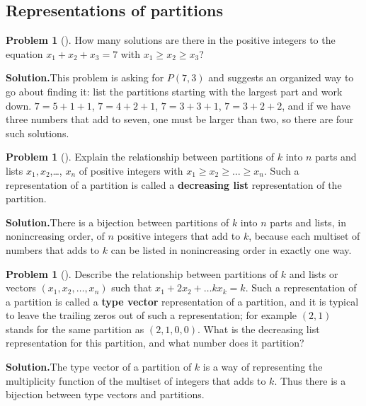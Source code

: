 \documentclass[10pt,]{book}
\newcommand{\terminology}[1]{\textbf{#1}}
\theoremstyle{plain}
\theoremstyle{definition}
\newtheorem{activity}[project]{Problem}
\theoremstyle{definition}
\numberwithin{equation}{chapter}
\begin{document}
\subsection[{Representations of partitions}]{Representations of partitions}\label{subsection-31}
\begin{activity}[]\label{activity-159}
How many solutions are there in the positive integers to the equation \(x_1+x_2+x_3 =7\) with \(x_1\ge x_2\ge x_3\)?%
\par\medskip\noindent%
\textbf{Solution.}\quad This problem is asking for \(P(7,3)\) and suggests an organized way to go about finding it: list the partitions starting with the largest part and work down. \(7=5+1+1\), \(7=4+2+1\), \(7=3+3+1\), \(7=3+2+2\), and if we have three numbers that add to seven, one must be larger than two, so there are four such solutions.%
\end{activity}
\begin{activity}[]\label{activity-160}
Explain the relationship between partitions of \(k\) into \(n\) parts and lists \(x_1,x_2\),\dots{}, \(x_n\) of positive integers with \(x_1\ge x_2\ge\ldots \ge x_n\). Such a representation of a partition is called a \terminology{decreasing list} representation of the partition.%
\par\medskip\noindent%
\textbf{Solution.}\quad There is a bijection between partitions of \(k\) into \(n\) parts and lists, in nonincreasing order, of \(n\) positive integers that add to \(k\), because each multiset of numbers that adds to \(k\) can be listed in nonincreasing order in exactly one way.%
\end{activity}
\begin{activity}[]\label{activity-161}
Describe the relationship between partitions of \(k\) and lists or vectors \((x_1,x_2,\ldots,x_n)\) such that \(x_1+2x_2+\ldots kx_k = k\).  Such a representation of a partition is called a \terminology{type vector} representation of a partition, and it is typical to leave the trailing zeros out of such a representation; for example \((2,1)\) stands for the same partition as \((2,1,0,0)\). What is the decreasing list representation for this partition, and what number does it partition?%
\par\medskip\noindent%
\textbf{Solution.}\quad The type vector of a partition of \(k\) is a way of representing the multiplicity function of the multiset of integers that adds to \(k\). Thus there is a bijection between type vectors and partitions.%
\end{activity}
\end{document}
